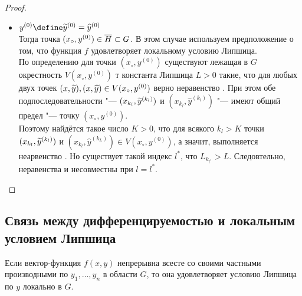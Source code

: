 \begin{proof}
\begin{itemize}
        \item $ y^{(0)} \define \vawe{y}^{(0)} = \hat{y}^{(0)} $ \\
        Тогда точка $ (x_\circ, y^{(0)}) \in \overline H \subset G $. В этом случае используем предположение о том, что функция $ f $ удовлетворяет локальному условию Липшица. \\
        По определению для точки $ (x_\circ, y^{(0)}) $ существуют лежащая в $ G $ окрестность $ V(x_\circ, y^{(0)}) $ т константа Липшица $ L > 0 $ такие, что для любых двух точек $ (x, \widetilde y), (x, \widehat y) \in V(x_\circ, y^{(0)}) $ верно неравенство . При этом обе подпоследовательности "--- $ (x_{k_l}, \widetilde{y}^{(k_l)}) $ и $ (x_{k_l}, \hat{y}^{(k_l)}) $ "--- имеют общий предел "--- точку $ (x_\circ, y^{(0)}) $. \\
        Поэтому найдётся такое число $ K > 0 $, что для всякого $ k_l > K $ точки $ (x_{k_l}, \widetilde{y}^{(k_l)}) $ и $ (x_{k_l}, \hat{y}^{(k_L)}) \in V(x_\circ, y^{(0)}) $, а значит, выполняется неарвенство . Но существует такой индекс $ l^* $, что $ L_{k_{l^*}} > L $. Следовтельно, неравенства  и  несовместны при $ l = l^* $.
    \end{itemize}
\end{proof}

\subsection{Связь между дифференцируемостью и локальным условием Липшица}

\begin{lemma}
	Если вектор-функция $ f(x, y) $ непрерывна всесте со своими частными производными по $ y_1, \dots, y_n $ в области $ G $, то она удовлетворяет условию Липшица по $ y $ локально в $ G $.
\end{lemma}


